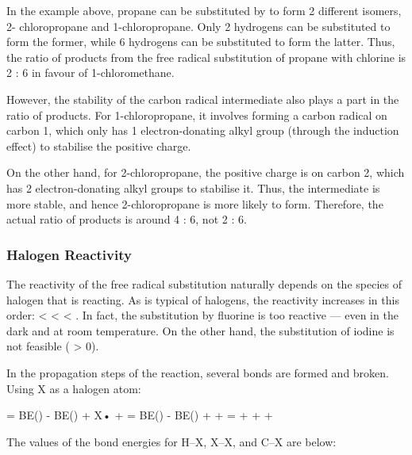 				In the example above, propane can be substituted by \ch{\Cl} to form 2 different isomers, 2- chloropropane and 1-chloropropane.
				Only 2 hydrogens can be substituted to form the former, while 6 hydrogens can be substituted to form the latter. Thus, the
				 ratio of products from the free radical substitution of propane with chlorine is 2 : 6 in
				favour of 1-chloromethane.

				However, the stability of the carbon radical intermediate also plays a part in the ratio of products. For 1-chloropropane,
				it involves forming a carbon radical on carbon 1, which only has 1 electron-donating alkyl group (through the induction effect)
				to stabilise the positive charge.

				On the other hand, for 2-chloropropane, the positive charge is on carbon 2, which has 2 electron-donating alkyl groups to stabilise
				it. Thus, the intermediate is more stable, and hence 2-chloropropane is more likely to form.
				Therefore, the actual ratio of products is around 4 : 6, not 2 : 6.


			\pagebreak
			\subsubsection{Halogen Reactivity}

				The reactivity of the free radical substitution naturally depends on the species of halogen that is reacting.
				As is typical of halogens, the reactivity increases in this order:  <  <  < .
				In fact, the substitution by fluorine is too reactive --- even in the dark and at room temperature. On the other hand,
				the substitution of iodine is not feasible (\gibb{} > 0).

				In the propagation steps of the reaction, several bonds are formed and broken. Using X as a halogen atom:

				\vspace{1em}
				\vbox{ = BE() - BE() \tabto{60mm} + X•                \tabto{85mm} \ch{->}  +  }
				\vbox{ = BE() - BE() \tabto{60mm} +  \tabto{85mm} \ch{->}  +    }
				\vbox{ =  +          \tabto{60mm} +              \tabto{85mm} \ch{->}  +   }

				The values of the bond energies for H–X, X–X, and C–X are below:

